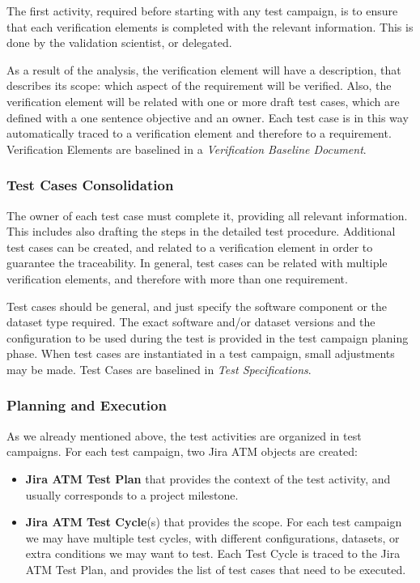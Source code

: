 The first activity, required before starting with any test campaign, is to ensure that each verification elements is completed with the relevant information.
This is done by the validation scientist, or delegated.

As a result of the analysis, the verification element will have a description, that describes its scope: which aspect of the requirement will be verified.
Also, the verification element will be related with one or more draft test cases, which are  defined with a one sentence objective and an owner.
Each test case is in this way automatically traced to a verification element and therefore to a requirement.
Verification Elements are baselined in a \textit{Verification Baseline Document}.

\subsubsection{Test Cases Consolidation}

The owner of each test case must complete it, providing all relevant information.
This includes also drafting the steps in the detailed test procedure.
Additional test cases can be created, and related to a verification element in order to guarantee the traceability.
In general, test cases can be related with multiple verification elements, and therefore with more than one requirement.

Test cases should be general, and just specify the software component or the dataset type required.
The exact software and/or dataset versions and the configuration to be used during the test
is provided in the test campaign planing phase.
When test cases are instantiated in a test campaign, small adjustments may be made.
Test Cases are baselined in \textit{Test Specifications}.

\subsubsection{Planning and Execution}

As we already mentioned above, the test activities are organized in test campaigns.
For each test campaign, two Jira ATM objects are created:

\begin{itemize}
\item \textbf{Jira ATM Test Plan} that provides the context of the test activity, and usually corresponds to a project milestone.
\item \textbf{Jira ATM Test Cycle}(s) that provides the scope. For each test campaign we may have multiple test cycles,
with different configurations, datasets, or extra conditions we may want to test. Each Test Cycle is traced
to the Jira ATM Test Plan, and provides the list of test cases that need to be executed.
\end{itemize}

